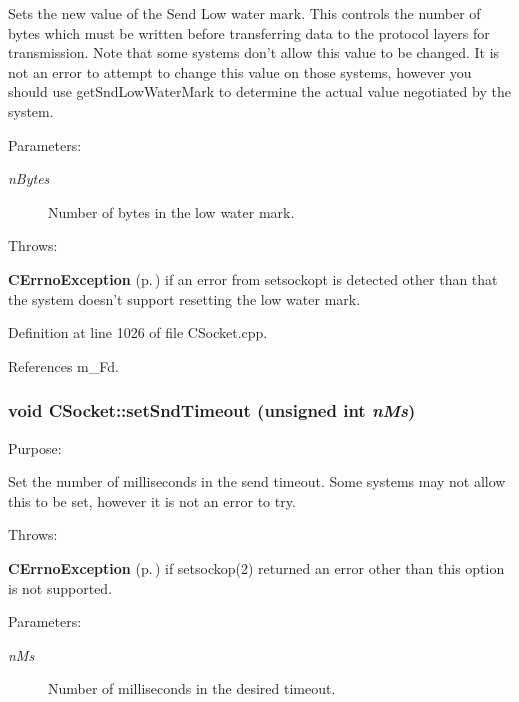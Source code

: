 Sets the new value of the Send Low water mark. This controls the number of bytes which must be written before transferring data to the protocol layers for transmission. Note that some systems don't allow this value to be changed. It is not an error to attempt to change this value on those systems, however you should use get\-Snd\-Low\-Water\-Mark to determine the actual value negotiated by the system.\begin{Desc}
\item[Parameters: ]\par
\begin{description}
\item[{\em 
n\-Bytes}]Number of bytes in the low water mark.\end{description}
\end{Desc}
Throws:\begin{CompactItemize}
\item 
{\bf CErrno\-Exception} {\rm (p.\,\pageref{classCErrnoException})} if an error from setsockopt is detected other than that the system doesn't support resetting the low water mark. \end{CompactItemize}


Definition at line 1026 of file CSocket.cpp.

References m\_\-Fd.
\subsubsection{\setlength{\rightskip}{0pt plus 5cm}void CSocket::set\-Snd\-Timeout (unsigned int {\em n\-Ms})}\label{classCSocket_a22}


Purpose:

Set the number of milliseconds in the send timeout. Some systems may not allow this to be set, however it is not an error to try.

Throws:\begin{CompactItemize}
\item 
{\bf CErrno\-Exception} {\rm (p.\,\pageref{classCErrnoException})} if setsockop(2) returned an error other than this option is not supported.\end{CompactItemize}
\begin{Desc}
\item[Parameters: ]\par
\begin{description}
\item[{\em 
n\-Ms}]Number of milliseconds in the desired timeout. \end{description}
\end{Desc}


